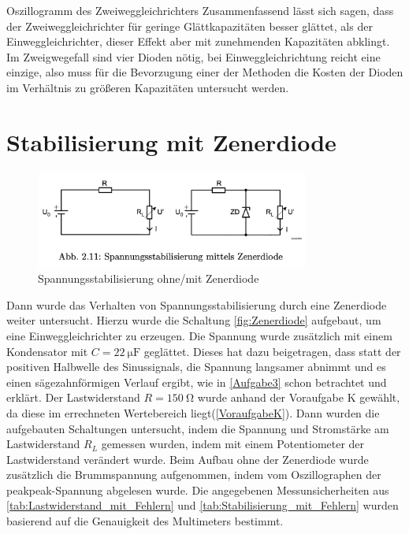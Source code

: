 \documentclass{article}
\theoremstyle{definition}
\begin{document}
\begin{aufgabe}{Oszillogramm des Zweiweggleichrichters}
    Zusammenfassend lässt sich sagen, dass der Zweiweggleichrichter für geringe Glättkapazitäten besser glättet, als der Einweggleichrichter, dieser Effekt aber mit zunehmenden Kapazitäten abklingt. Im Zweigwegefall sind vier Dioden nötig, bei Einweggleichrichtung reicht eine einzige, also muss für die Bevorzugung einer der Methoden die Kosten der Dioden im Verhältnis zu größeren Kapazitäten untersucht werden.

\end{aufgabe}
\clearpage
\section{Stabilisierung mit Zenerdiode}

\begin{figure}[H]
             \centering
             \includegraphics[width=0.8\textwidth]{figs/fig2_11.png}
             \caption{Spannungsstabilisierung ohne/mit Zenerdiode \cite{anleitung}}
             \label{fig:Zenerdiode}
         \end{figure}

Dann wurde das Verhalten von Spannungsstabilisierung durch eine Zenerdiode weiter untersucht. Hierzu wurde die Schaltung 
\autoref{fig:Zenerdiode} aufgebaut, um eine Einweggleichrichter zu erzeugen. Die Spannung wurde zusätzlich mit einem Kondensator
 mit $C= \SI{22}{\micro \farad}$ geglättet. Dieses hat dazu beigetragen, dass statt der positiven Halbwelle des Sinussignals, die 
 Spannung langsamer abnimmt und es einen sägezahnförmigen Verlauf ergibt, wie in \autoref{Aufgabe3} schon betrachtet 
 und erklärt.
Der Lastwiderstand $R= \SI{150}{\ohm}$ wurde anhand der Voraufgabe K gewählt, da diese im errechneten Wertebereich 
liegt(\autoref{VoraufgabeK}). Dann wurden die aufgebauten Schaltungen untersucht, indem die Spannung und Stromstärke am 
Lastwiderstand $R_L$ gemessen wurden, indem mit einem Potentiometer der Lastwiderstand verändert wurde. Beim Aufbau ohne 
der Zenerdiode wurde zusätzlich die Brummspannung aufgenommen, indem vom Oszillographen der peakpeak-Spannung abgelesen wurde. 
Die angegebenen Messunsicherheiten aus \autoref{tab:Lastwiderstand_mit_Fehlern} und \autoref{tab:Stabilisierung_mit_Fehlern} wurden 
basierend auf die Genauigkeit des Multimeters bestimmt. \cite{m2005-multimeter}
\end{document}

